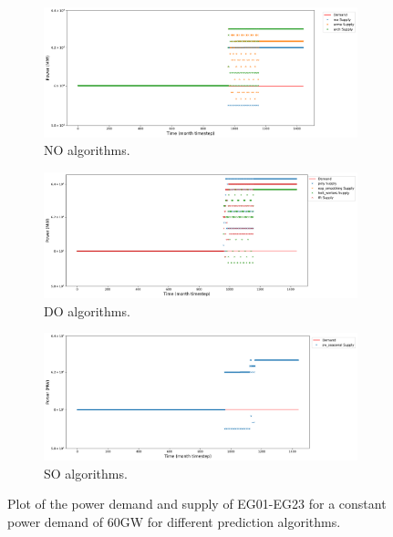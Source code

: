 \documentclass[11pt,letterpaper]{article}
\begin{document}
\begin{figure}[]
	\centering
	\begin{subfigure}[t]{.95\textwidth}
		\centering
		\includegraphics[width=\linewidth]{23-power-bufferB20001.png} 
		\caption{NO algorithms.}
		\label{fig:23powerNO}
	\end{subfigure}
	\vspace{.9cm}
	\begin{subfigure}[t]{.95\textwidth}
		\centering
		\includegraphics[width=\linewidth]{23-power-bufferB20002.png} 
		\caption{DO algorithms.}
		\label{fig:23powerDO}
	\end{subfigure}
	\vspace{.1cm}
	\begin{subfigure}[t]{.95\textwidth}
		\centering
		\includegraphics[width=\linewidth]{23-power-bufferB20003.png} 
		\caption{SO algorithms.}
		\label{fig:23powerSO}
	\end{subfigure}
	\hfill
	\caption{Plot of the power demand and supply of EG01-EG23 for a constant power demand of 60GW for different prediction algorithms.}
	\label{fig:23power}
\end{figure}
\end{document}
